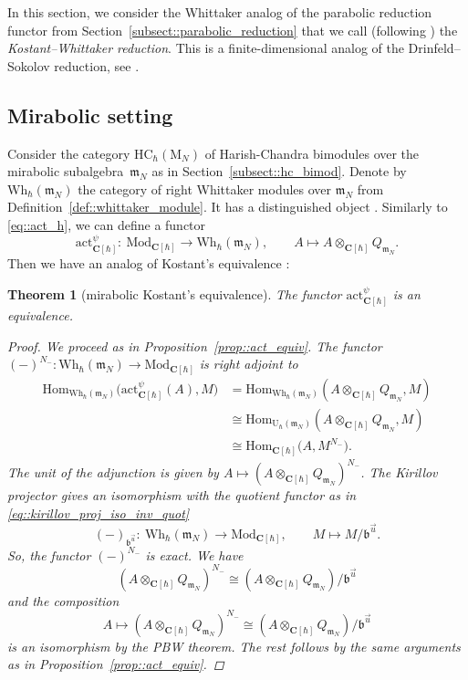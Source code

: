 \documentclass[10pt,a4paper]{amsart}
\numberwithin{equation}{section}
\newtheorem{Theorem}{Theorem}[section]
\newcommand{\C}{\mathbf{C}}
\newcommand{\U}{\mathrm{U}_{\hbar}}
\newcommand{\rM}{\mathrm{M}}
\renewcommand{\b}{\mathfrak{b}}
\newcommand{\n}{\mathfrak{n}}
\newcommand{\m}{\mathfrak{m}}
\newcommand{\Wh}{\mathrm{Wh}_{\hbar}}
\newcommand{\act}{\mathrm{act}}
\newcommand{\Mod}[1]{{\mathrm{Mod}}_{#1}}
\newcommand{\HC}{\mathrm{HC}_{\hbar}}
\newcommand{\Hom}{\mathrm{Hom}}
\begin{document}
	In this section, we consider the Whittaker analog of the parabolic reduction functor from Section~\ref{subsect::parabolic_reduction} that we call (following \cite{BezrukavnikovFinkelberg}) the \emph{Kostant--Whittaker reduction}. This is a finite-dimensional analog of the Drinfeld--Sokolov reduction, see \cite{Arakawa}.
	
	\subsection{Mirabolic setting} Consider the category $\HC(\rM_N)$ of Harish-Chandra bimodules over the mirabolic subalgebra~$\m_N$ as in Section~\ref{subsect::hc_bimod}. Denote by $\Wh(\m_N)$ the category of right Whittaker modules over $\m_N$ from Definition~\ref{def::whittaker_module}. It has a distinguished object \smash{$Q_{\m_N} = \n_-^{\psi} \backslash \U(\m_N)$}. Similarly to \eqref{eq::act_h}, we can define a functor
	\begin{equation*}
		\act_{\C[\hbar]}^{\psi} \colon\ \Mod{\C[\hbar]} \rightarrow \Wh(\m_N), \qquad A \mapsto A \otimes_{\C[\hbar]} Q_{\m_N}.
	\end{equation*}
	Then we have an analog of Kostant's equivalence \cite{Kostant}:
	\begin{Theorem}[mirabolic Kostant's equivalence]
		\label{thm::mirabolic_skryabin}
		The functor $\act_{\C[\hbar]}^{\psi}$ is an equivalence.
		\begin{proof}
			We proceed as in Proposition~\ref{prop::act_equiv}. The functor $(-)^{N_-} \colon \Wh(\m_N) \rightarrow \Mod{\C[\hbar]}$ is right adjoint to \smash{$\act_{\C[\hbar]}^{\psi}$}
			\begin{align*}
				\Hom_{\Wh(\m_N)} \bigl(\act_{\C[\hbar]}^{\psi}(A), M\bigr) &= \Hom_{\Wh(\m_N)}(A \otimes_{\C[\hbar]} Q_{\m_N},M) \\
				&\cong \Hom_{\U(\m_N)} (A \otimes_{\C[\hbar]} Q_{\m_N},M) \\
				&\cong \Hom_{\C[\hbar]}\bigl(A,M^{N_-}\bigr).
			\end{align*}
			The unit of the adjunction is given by
$
			A \mapsto (A \otimes_{\C[\hbar]} Q_{\m_N})^{N_-}$.
			The Kirillov projector gives an isomorphism with the quotient functor as in \eqref{eq::kirillov_proj_iso_inv_quot}
			\[
			(-)_{\b^{\vec{u}}}\colon\ \Wh(\m_N) \rightarrow \Mod{\C[\hbar]}, \qquad M \mapsto M/\b^{\vec{u}}.
			\]
			So, the functor $(-)^{N_-}$ is exact. We have
			\[
			(A \otimes_{\C[\hbar]} Q_{\m_N})^{N_-} \cong (A \otimes_{\C[\hbar]} Q_{\m_N})/ \b^{\vec{u}}
			\]
			and the composition
			\[
			A \mapsto (A \otimes_{\C[\hbar]} Q_{\m_N})^{N_-} \cong (A \otimes_{\C[\hbar]} Q_{\m_N})/ \b^{\vec{u}}
			\]
			is an isomorphism by the PBW theorem. The rest follows by the same arguments as in Proposition~\ref{prop::act_equiv}.
		\end{proof}
	\end{Theorem}
	
\end{document}
